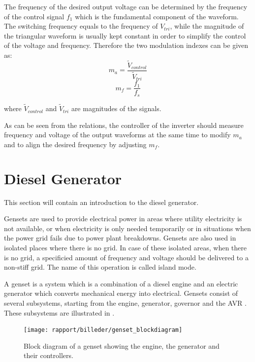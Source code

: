 The frequency of the desired output voltage can be determined by the frequency of the control signal $f_1$ which is the fundamental component of the waveform. The switching frequency equals to the frequency of $V_{tri}$, while the magnitude of the triangular waveform is usually kept constant in order to simplify the control of the voltage and frequency. Therefore the two modulation indexes can be given as: 
\begin{equation} 
\label{eq:ma}
m_a = \frac{\tilde{V}_{control}}{\tilde{V}_{tri}}
\end{equation}
\begin{equation} 
\label{eq:mf}
m_f = \frac{f_1}{f_s}
\end{equation}

where $\tilde{V}_{control}$ and $\tilde{V}_{tri}$ are magnitudes of the signals.

As can be seen from the relations, the controller of the inverter should measure frequency and voltage of the output waveforms at the same time to modify $m_a$ and to align the desired frequency by adjusting $m_f$.

\section{Diesel Generator}
\label{diesel_generator}
This section will contain an introduction to the diesel generator.

Gensets are used to provide electrical power in areas where utility electricity is not available, or when electricity is only needed temporarily or in situations when the power grid fails due to power plant breakdowns. Gensets are also used in isolated places where there is no grid.
In case of these isolated areas, when there is no grid, a specificied amount of frequency and voltage should be delivered to a non-stiff grid. The name of this operation is called island mode. 

A genset is a system which is a combination of a diesel engine and an electric generator which converts mechanical energy into electrical. Gensets consist of several subsystems, starting from the engine, generator, governor and the AVR \cite{genset_how_it_works}. These subsystems are illustrated in .  
 
\begin{figure}[H]
\centering
\texttt{[image: rapport/billeder/genset\_blockdiagram]}
\caption{Block diagram of a genset showing the engine, the generator and their controllers.}
\label{fig:genset_blockdiagram}
\end{figure}

